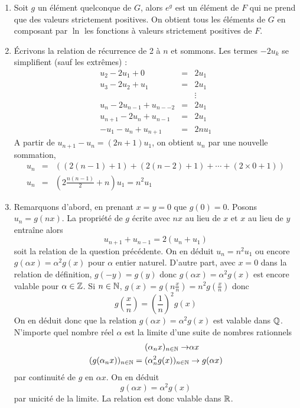 \begin{enumerate}
\item  Soit $g$ un {\'e}l{\'e}ment quelconque de $G$, alors $e^{g}$ est un
{\'e}l{\'e}ment de $F$ qui ne prend que des valeurs strictement positives.
On obtient tous les {\'e}l{\'e}ments de $G$ en composant par $\ln $ les
fonctions {\`a} valeurs strictement positives de $F$.

\item  \'Ecrivons la relation de r{\'e}currence de 2 {\`a} $n$ et sommons. Les
termes $-2u_{k}$ se simplifient (sauf les extr{\^e}mes) :
\begin{eqnarray*}
u_{2}-2u_{1}+0 &=&2u_{1} \\
u_{3}-2u_{2}+u_{1} &=&2u_{1} \\
&&\vdots  \\
u_{n}-2u_{n-1}+u_{n--2} &=&2u_{1} \\
u_{n+1}-2u_{n}+u_{n-1} &=&2u_{1} \\
-u_{1}-u_{n}+u_{n+1} &=&2nu_{1}
\end{eqnarray*}
A partir de $u_{n+1}-u_{n}=(2n+1)u_{1}$, on obtient $u_{n}$ par
une nouvelle sommation,
\begin{eqnarray*}
u_{n}&=&\left( (2(n-1)+1)+(2(n-2)+1)+\cdots +(2\times 0+1)\right)\\
u_n&=&\left( 2\frac{n(n-1)}{2}+n\right) u_{1}=n^{2}u_{1}
\end{eqnarray*}

\item  Remarquons d'abord, en prenant $x=y=0$ que $g(0)=0$.\newline
Posons $u_{n}=g(nx)$. La propri{\'e}t{\'e} de $g$ {\'e}crite avec $nx$ au lieu de $x$
et $x$ au lieu de $y$ entra\^{i}ne alors
\begin{displaymath}
u_{n+1}+u_{n-1}=2(u_{n}+u_{1}) 
\end{displaymath}
soit la relation de la question pr{\'e}c{\'e}dente.\newline
On en d{\'e}duit $u_{n}=n^{2}u_{1}$ ou encore
$g(\alpha x)=\alpha ^{2}g(x)$ pour $\alpha $ entier naturel.
D'autre part, avec $x=0$ dans la relation de d{\'e}finition,
$g(-y)=g(y)$ donc $g(\alpha x)=\alpha ^{2}g(x)$ est encore valable
pour $\alpha \in \mathbb{Z}$.\newline
Si $n\in \mathbb{N}$, $g(x)=g(n\frac{x}{n})=n^{2}g(\frac{x}{n})$ donc 
\begin{displaymath}
g(\frac{x}{n})=(\frac{1}{n})^{2}g(x)
\end{displaymath}
On en d{\'e}duit donc que la relation $g(\alpha x)=\alpha ^{2}g(x)$ est valable dans $\mathbb{Q}$.\newline
N'importe quel nombre r{\'e}el $\alpha$ est la limite d'une suite de nombres rationnels
\begin{align*}
 (\alpha_n x)_{n\in\mathbb{N}}  \rightarrow & \alpha x \\
(g(\alpha_n x))_{n\in\mathbb{N}} = (\alpha_n^2 g(x))_{n\in\mathbb{N}} & \rightarrow  g(\alpha x) 
\end{align*}
par continuité de $g$ en $\alpha x$. On en déduit
\begin{displaymath}
 g(\alpha x)=\alpha ^{2}g(x)
\end{displaymath}
par unicité de la limite. La relation est donc valable dans $\mathbb{R}$.


\end{enumerate}
